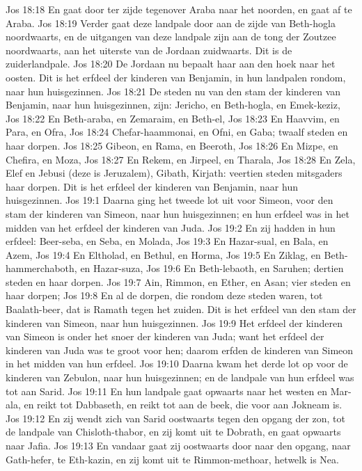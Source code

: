 Jos 18:18  En gaat door ter zijde tegenover Araba naar het noorden, en gaat af te Araba.
Jos 18:19  Verder gaat deze landpale door aan de zijde van Beth-hogla noordwaarts, en de uitgangen van deze landpale zijn aan de tong der Zoutzee noordwaarts, aan het uiterste van de Jordaan zuidwaarts. Dit is de zuiderlandpale.
Jos 18:20  De Jordaan nu bepaalt haar aan den hoek naar het oosten. Dit is het erfdeel der kinderen van Benjamin, in hun landpalen rondom, naar hun huisgezinnen.
Jos 18:21  De steden nu van den stam der kinderen van Benjamin, naar hun huisgezinnen, zijn: Jericho, en Beth-hogla, en Emek-keziz,
Jos 18:22  En Beth-araba, en Zemaraim, en Beth-el,
Jos 18:23  En Haavvim, en Para, en Ofra,
Jos 18:24  Chefar-haammonai, en Ofni, en Gaba; twaalf steden en haar dorpen.
Jos 18:25  Gibeon, en Rama, en Beeroth,
Jos 18:26  En Mizpe, en Chefira, en Moza,
Jos 18:27  En Rekem, en Jirpeel, en Tharala,
Jos 18:28  En Zela, Elef en Jebusi (deze is Jeruzalem), Gibath, Kirjath: veertien steden mitsgaders haar dorpen. Dit is het erfdeel der kinderen van Benjamin, naar hun huisgezinnen.
Jos 19:1  Daarna ging het tweede lot uit voor Simeon, voor den stam der kinderen van Simeon, naar hun huisgezinnen; en hun erfdeel was in het midden van het erfdeel der kinderen van Juda.
Jos 19:2  En zij hadden in hun erfdeel: Beer-seba, en Seba, en Molada,
Jos 19:3  En Hazar-sual, en Bala, en Azem,
Jos 19:4  En Eltholad, en Bethul, en Horma,
Jos 19:5  En Ziklag, en Beth-hammerchaboth, en Hazar-suza,
Jos 19:6  En Beth-lebaoth, en Saruhen; dertien steden en haar dorpen.
Jos 19:7  Ain, Rimmon, en Ether, en Asan; vier steden en haar dorpen;
Jos 19:8  En al de dorpen, die rondom deze steden waren, tot Baalath-beer, dat is Ramath tegen het zuiden. Dit is het erfdeel van den stam der kinderen van Simeon, naar hun huisgezinnen.
Jos 19:9  Het erfdeel der kinderen van Simeon is onder het snoer der kinderen van Juda; want het erfdeel der kinderen van Juda was te groot voor hen; daarom erfden de kinderen van Simeon in het midden van hun erfdeel.
Jos 19:10  Daarna kwam het derde lot op voor de kinderen van Zebulon, naar hun huisgezinnen; en de landpale van hun erfdeel was tot aan Sarid.
Jos 19:11  En hun landpale gaat opwaarts naar het westen en Mar-ala, en reikt tot Dabbaseth, en reikt tot aan de beek, die voor aan Jokneam is.
Jos 19:12  En zij wendt zich van Sarid oostwaarts tegen den opgang der zon, tot de landpale van Chisloth-thabor, en zij komt uit te Dobrath, en gaat opwaarts naar Jafia.
Jos 19:13  En vandaar gaat zij oostwaarts door naar den opgang, naar Gath-hefer, te Eth-kazin, en zij komt uit te Rimmon-methoar, hetwelk is Nea.
